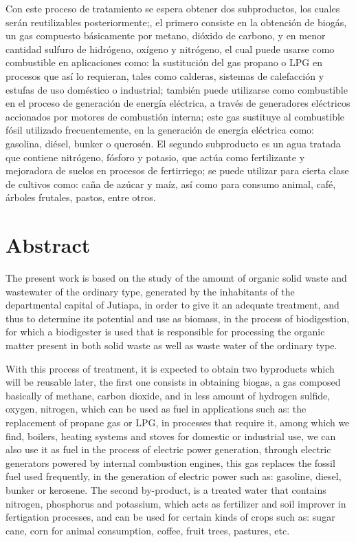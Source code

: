 \documentclass[11pt,spanish,Letterpaper,openany]{book}
\begin{document}
Con este proceso de tratamiento se espera obtener dos subproductos, los cuales serán reutilizables posteriormente;, el primero consiste en la obtención de biogás, un gas compuesto básicamente por metano, dióxido de carbono, y en menor cantidad sulfuro de hidrógeno, oxígeno y nitrógeno, el cual puede usarse como combustible en aplicaciones como: la sustitución del gas propano o LPG en procesos que así lo requieran, tales como calderas, sistemas de calefacción y estufas de uso doméstico o industrial; también puede utilizarse como combustible en el proceso de generación de energía eléctrica, a través de generadores eléctricos accionados por motores de combustión interna; este gas sustituye al combustible fósil utilizado frecuentemente, en la generación de energía eléctrica como: gasolina, diésel, bunker o querosén. El segundo subproducto es un agua tratada que contiene nitrógeno, fósforo y potasio, que actúa como fertilizante y mejoradora de suelos en procesos de fertirriego; se puede utilizar para cierta clase de cultivos como: caña de azúcar y maíz, así como para consumo animal, café, árboles frutales, pastos, entre otros.

\hypertarget{abstract-1}{%
\section*{Abstract}\label{abstract-1}}

The present work is based on the study of the amount of organic solid waste and wastewater of the ordinary type, generated by the inhabitants of the departmental capital of Jutiapa, in order to give it an adequate treatment, and thus to determine its potential and use as biomass, in the process of biodigestion, for which a biodigester is used that is responsible for processing the organic matter present in both solid waste as well as waste water of the ordinary type.

\newpage

With this process of treatment, it is expected to obtain two byproducts which will be reusable later, the first one consists in obtaining biogas, a gas composed basically of methane, carbon dioxide, and in less amount of hydrogen sulfide, oxygen, nitrogen, which can be used as fuel in applications such as: the replacement of propane gas or LPG, in processes that require it, among which we find, boilers, heating systems and stoves for domestic or industrial use, we can also use it as fuel in the process of electric power generation, through electric generators powered by internal combustion engines, this gas replaces the fossil fuel used frequently, in the generation of electric power such as: gasoline, diesel, bunker or kerosene. The second by-product, is a treated water that contains nitrogen, phosphorus and potassium, which acts as fertilizer and soil improver in fertigation processes, and can be used for certain kinds of crops such as: sugar cane, corn for animal consumption, coffee, fruit trees, pastures, etc.
\end{document}
